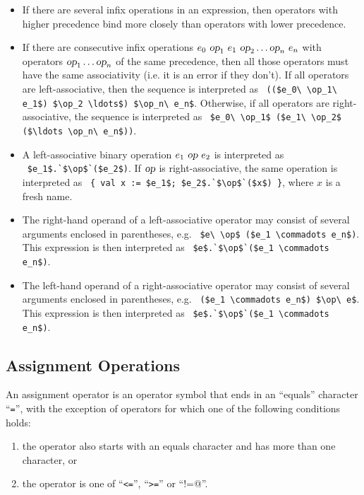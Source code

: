 \begin{itemize}
\item If there are several infix operations in an expression, then operators with higher precedence bind more closely than operators with lower precedence. 

\item If there are consecutive infix operations $e_0\ \mbox{\sl op}_1\ e_1\ \mbox{\sl op}_2 \ldots \mbox{\sl op}_n\ e_n$ with operators $\mbox{\sl op}_1 \ldots \mbox{\sl op}_n$ of the same precedence, then all those operators must have the same associativity (i.e. it is an error if they don't). If all operators are left-associative, then the sequence is interpreted as ~\lstinline!(($e_0\ \op_1\ e_1$) $\op_2 \ldots$) $\op_n\ e_n$!. Otherwise, if all operators are right-associative, the sequence is interpreted as ~\lstinline!$e_0\ \op_1$ ($e_1\ \op_2$ ($\ldots \op_n\ e_n$))!.

\item A left-associative binary operation $e_1\ \mbox{\sl op}\ e_2$ is interpreted as ~\lstinline!$e_1$.`$\op$`($e_2$)!. If $\mbox{\sl op}$ is right-associative, the same operation is interpreted as ~\lstinline!{ val x := $e_1$; $e_2$.`$\op$`($x$) }!, where $x$ is a fresh name. 

\item The right-hand operand of a left-associative operator may consist of several arguments enclosed in parentheses, e.g. ~\lstinline!$e\ \op$ ($e_1 \commadots e_n$)!. This expression is then interpreted as ~\lstinline!$e$.`$\op$`($e_1 \commadots e_n$)!. 

\item The left-hand operand of a right-associative operator may consist of several arguments enclosed in parentheses, e.g. ~\lstinline!($e_1 \commadots e_n$) $\op\ e$!. This expression is then interpreted as ~\lstinline!$e$.`$\op$`($e_1 \commadots e_n$)!. 
\end{itemize}






\subsection{Assignment Operations}
\label{sec:assignment-operations}

An assignment operator is an operator symbol that ends in an ``equals'' character ``\lstinline!=!'', with the exception of operators for which one of the following conditions holds: 
\begin{enumerate}
\item the operator also starts with an equals character and has more than one character, or
\item the operator is one of ``\lstinline!<=!'', ``\lstinline!>=!'' or ``\lstinline@!=@''.
\end{enumerate}

